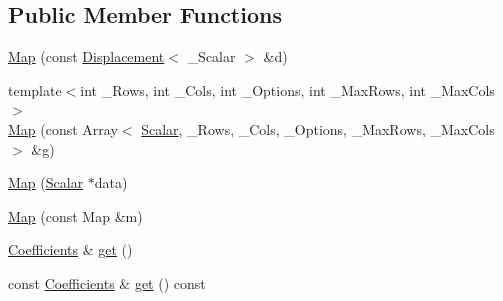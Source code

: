\subsection*{Public Member Functions}
\begin{DoxyCompactItemize}
\item 
\hyperlink{class_map_3_01_displacement_3_01___scalar_01_4_00_01_map_options_00_01_stride_type_01_4_a7355e77dc9b91bd8cb68f20847318f0f}{Map} (const \hyperlink{class_displacement}{Displacement}$<$ \+\_\+\+Scalar $>$ \&d)
\item 
{\footnotesize template$<$int \+\_\+\+Rows, int \+\_\+\+Cols, int \+\_\+\+Options, int \+\_\+\+Max\+Rows, int \+\_\+\+Max\+Cols$>$ }\\\hyperlink{class_map_3_01_displacement_3_01___scalar_01_4_00_01_map_options_00_01_stride_type_01_4_a711f80d439ccbc921e0b06776d193768}{Map} (const Array$<$ \hyperlink{class_map_3_01_displacement_3_01___scalar_01_4_00_01_map_options_00_01_stride_type_01_4_a1558058db0e90cb7253d6b2dbf414099}{Scalar}, \+\_\+\+Rows, \+\_\+\+Cols, \+\_\+\+Options, \+\_\+\+Max\+Rows, \+\_\+\+Max\+Cols $>$ \&g)
\item 
\hyperlink{class_map_3_01_displacement_3_01___scalar_01_4_00_01_map_options_00_01_stride_type_01_4_ad391569a149b8e0d7c276461901c9425}{Map} (\hyperlink{class_map_3_01_displacement_3_01___scalar_01_4_00_01_map_options_00_01_stride_type_01_4_a1558058db0e90cb7253d6b2dbf414099}{Scalar} $\ast$data)
\item 
\hyperlink{class_map_3_01_displacement_3_01___scalar_01_4_00_01_map_options_00_01_stride_type_01_4_aea0cddfda465eac57cb8914c2d462ad7}{Map} (const Map \&m)
\item 
\hyperlink{class_map_3_01_displacement_3_01___scalar_01_4_00_01_map_options_00_01_stride_type_01_4_a3213feadb99e77889a832a1ef1e80b4b}{Coefficients} \& \hyperlink{class_map_3_01_displacement_3_01___scalar_01_4_00_01_map_options_00_01_stride_type_01_4_a74efdfedea56ddc6344905b30a8f6b5b}{get} ()
\item 
const \hyperlink{class_map_3_01_displacement_3_01___scalar_01_4_00_01_map_options_00_01_stride_type_01_4_a3213feadb99e77889a832a1ef1e80b4b}{Coefficients} \& \hyperlink{class_map_3_01_displacement_3_01___scalar_01_4_00_01_map_options_00_01_stride_type_01_4_a001e7c523f8895fce55047968d4ae80f}{get} () const
\end{DoxyCompactItemize}
